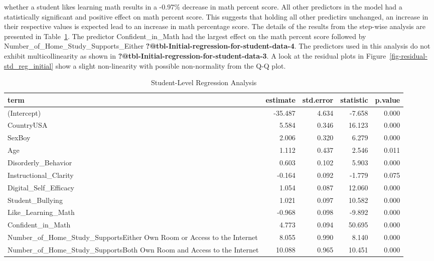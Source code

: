 \documentclass[
  letterpaper,
  DIV=11,
  numbers=noendperiod]{scrartcl}
\begin{document}
whether a student likes learning math results in a -0.97\% decrease in
math percent score. All other predictors in the model had a
statistically significant and positive effect on math percent score.
This suggests that holding all other predictirs unchanged, an increase
in their respective values is expected lead to an increase in math
percentage score. The details of the results from the step-wise analysis
are presented in Table~\ref{tbl-Initial-regression-for-student-data}.
The predictor Confident\_in\_Math had the largest effect on the math
percent score followed by Number\_of\_Home\_Study\_Supports\_Either
\textbf{?@tbl-Initial-regression-for-student-data-4}. The predictors
used in this analysis do not exhibit multicollinearity as shown in
\textbf{?@tbl-Initial-regression-for-student-data-3}. A look at the
residual plots in Figure~\ref{fig-residual-std_reg_initial} show a
slight non-linearity with possible non-normality from the Q-Q plot.

\begin{longtable}[t]{lrrrr}

\caption{\label{tbl-Initial-regression-for-student-data}Student-Level
Regression Analysis}

\tabularnewline

\toprule
term & estimate & std.error & statistic & p.value\\
\midrule
(Intercept) & -35.487 & 4.634 & -7.658 & 0.000\\
CountryUSA & 5.584 & 0.346 & 16.123 & 0.000\\
SexBoy & 2.006 & 0.320 & 6.279 & 0.000\\
Age & 1.112 & 0.437 & 2.546 & 0.011\\
Disorderly\_Behavior & 0.603 & 0.102 & 5.903 & 0.000\\
\addlinespace
Instructional\_Clarity & -0.164 & 0.092 & -1.779 & 0.075\\
Digital\_Self\_Efficacy & 1.054 & 0.087 & 12.060 & 0.000\\
Student\_Bullying & 1.021 & 0.097 & 10.582 & 0.000\\
Like\_Learning\_Math & -0.968 & 0.098 & -9.892 & 0.000\\
Confident\_in\_Math & 4.773 & 0.094 & 50.695 & 0.000\\
\addlinespace
Number\_of\_Home\_Study\_SupportsEither Own Room or Access to the Internet & 8.055 & 0.990 & 8.140 & 0.000\\
Number\_of\_Home\_Study\_SupportsBoth Own Room and Access to the Internet & 10.088 & 0.965 & 10.451 & 0.000\\
\bottomrule

\end{longtable}
\end{document}
